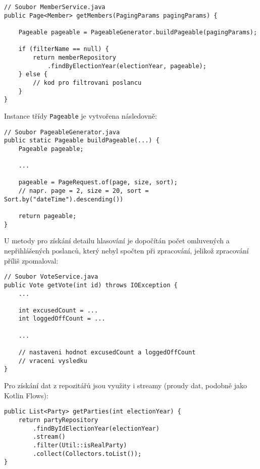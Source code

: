 \newpage

\begin{lstlisting}[caption={Ukázka doménové vrstvy pro vrácení seznamu poslanců}, label={lst:headers-paging}, tabsize=2]
// Soubor MemberService.java
public Page<Member> getMembers(PagingParams pagingParams) {
	
	Pageable pageable = PageableGenerator.buildPageable(pagingParams);
	
	if (filterName == null) {
		return memberRepository
			.findByElectionYear(electionYear, pageable);
	} else {
		// kod pro filtrovani poslancu
	}
}
\end{lstlisting}

\noindent Instance třídy \lstinline|Pageable| je vytvořena následovně:

\begin{lstlisting}[caption={Ukázka kódu pro sestavení objektu pro stránkování}, label={lst:paging-object}, tabsize=2]
// Soubor PageableGenerator.java
public static Pageable buildPageable(...) {
	Pageable pageable;
	
	...
	
	pageable = PageRequest.of(page, size, sort);
	// napr. page = 2, size = 20, sort = Sort.by("dateTime").descending())
	
	return pageable;
}

\end{lstlisting}

\noindent U metody pro získání detailu hlasování je dopočítán počet omluvených a nepřihlášených \linebreak poslanců, který nebyl spočten při zpracování, jelikož zpracování příliš zpomaloval:

\begin{lstlisting}[caption={Ukázka dopočtu statistik pro detail hlasování za běhu v doménové vrstvě}, label={lst:excused-count}, tabsize=2]
// Soubor VoteService.java
public Vote getVote(int id) throws IOException {
	...
	
	int excusedCount = ... 	
	int loggedOffCount = ...
	
	...
	
	// nastaveni hodnot excusedCount a loggedOffCount
	// vraceni vysledku
}
\end{lstlisting}

\noindent Pro získání dat z repozitářů jsou využity i streamy (proudy dat, podobně jako Kotlin Flows):

\begin{lstlisting}[caption={Ukázka použití streamu}, tabsize=2]
public List<Party> getParties(int electionYear) {
	return partyRepository
		.findByIdElectionYear(electionYear)
		.stream()
		.filter(Util::isRealParty)
		.collect(Collectors.toList());
}
\end{lstlisting}

